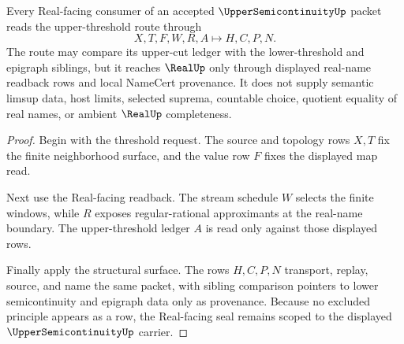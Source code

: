 \begin{theorem}
\label{thm:upper-semicontinuity-real-seal-scope}
Every Real-facing consumer of an accepted $\UpperSemicontinuityUp$ packet reads the upper-threshold route through
$$
X,T,F,W,R,A \longmapsto H,C,P,N .
$$
The route may compare its upper-cut ledger with the lower-threshold and epigraph siblings, but it reaches $\RealUp$ only through displayed real-name readback rows and local NameCert provenance. It does not supply semantic limsup data, host limits, selected suprema, countable choice, quotient equality of real names, or ambient $\RealUp$ completeness.
\end{theorem}
\begin{proof}
Begin with the threshold request. The source and topology rows $X,T$ fix the finite neighborhood surface, and the value row $F$ fixes the displayed map read.

Next use the Real-facing readback. The stream schedule $W$ selects the finite windows, while $R$ exposes regular-rational approximants at the real-name boundary. The upper-threshold ledger $A$ is read only against those displayed rows.

Finally apply the structural surface. The rows $H,C,P,N$ transport, replay, source, and name the same packet, with sibling comparison pointers to lower semicontinuity and epigraph data only as provenance. Because no excluded principle appears as a row, the Real-facing seal remains scoped to the displayed $\UpperSemicontinuityUp$ carrier.
\end{proof}


\begin{closurestatus}{\UpperSemicontinuityUp}
  \theoryclosure{\seedClosure}
  \formalstatus{\unformalizedV}
\end{closurestatus}
